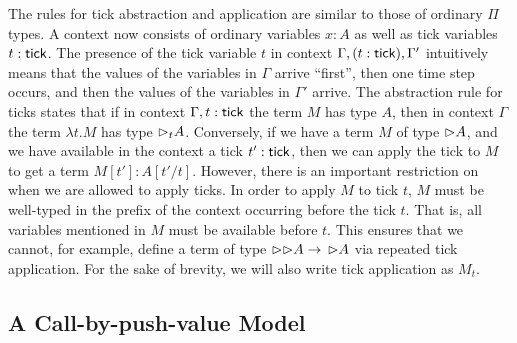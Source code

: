 The rules for tick abstraction and application are similar to those of ordinary
$\Pi$ types. A context now consists of ordinary variables $x : A$ as well as
tick variables $t : \mathsf{tick}$. The presence of the tick variable $t$ in context
$\Gamma, (t : \mathsf{tick}), \Gamma'$ intuitively means that the values of the
variables in $\Gamma$ arrive ``first'', then one time step occurs, and then the
values of the variables in $\Gamma'$ arrive.
%
The abstraction rule for ticks states that if in context $\Gamma, t : \mathsf{tick}$
the term $M$ has type $A$, then in context $\Gamma$ the term $\lambda t.M$ has
type ${\vartriangleright}_t A$.
%
Conversely, if we have a term $M$ of type ${\vartriangleright} A$, and we have available in
the context a tick $t' : \mathsf{tick}$, then we can apply the tick to $M$ to get a
term $M[t'] : A[t'/t]$. However, there is an important restriction on when we
are allowed to apply ticks. In order to apply $M$ to tick $t$, $M$ must be
well-typed in the prefix of the context occurring before the tick $t$. That is,
all variables mentioned in $M$ must be available before $t$. This ensures that
we cannot, for example, define a term of type ${\vartriangleright} {{\vartriangleright}} A \to\, {{\vartriangleright}}
A$ via repeated tick application.
%
For the sake of brevity, we will also write tick application as $M_t$.

\subsection{A Call-by-push-value Model}


